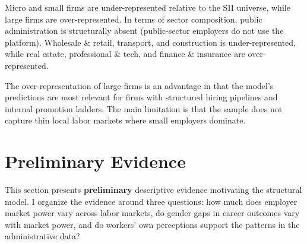 \documentclass[11pt]{article}
\begin{document}
Micro and small firms are under-represented relative to the SII universe, while large firms are over-represented. In terms of sector composition, public administration is structurally absent (public-sector employers do not use the platform). Wholesale \& retail, transport, and construction is under-represented, while real estate, professional \& tech, and finance \& insurance are over-represented. %

The over-representation of large firms is an advantage in that the model's predictions are most relevant for firms with structured hiring pipelines and internal promotion ladders. The main limitation is that the sample does not capture thin local labor markets where small employers dominate.

\section{Preliminary Evidence}

This section presents \textbf{preliminary} descriptive evidence motivating the structural model. I organize the evidence around three questions: how much does employer market power vary across labor markets, do gender gaps in career outcomes vary with market power, and do workers' own perceptions support the patterns in the administrative data? %
\end{document}
